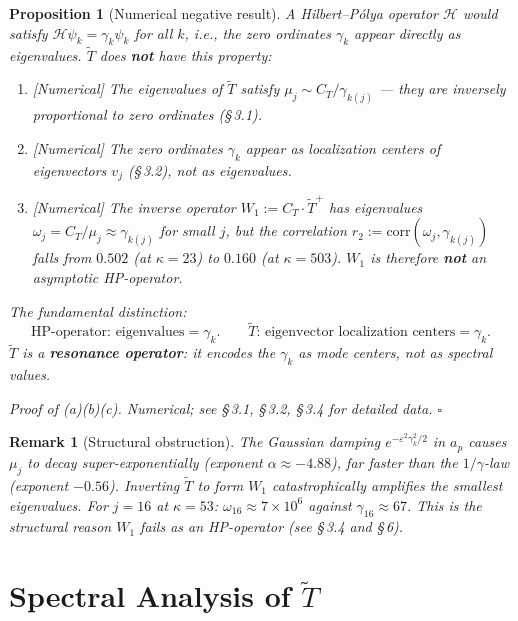 \documentclass[11pt]{article}
\newtheorem{proposition}[theorem]{Proposition}
\newtheorem*{remark}{Remark}
\newcommand{\Tt}{\widetilde{T}}
\newcommand{\CT}{C_{T}}
\newcommand{\Wone}{W_1}
\begin{document}
\begin{proposition}[Numerical negative result]\label{prop:not-HP}
A Hilbert--P\'olya operator $\mathcal{H}$ would satisfy
$\mathcal{H}\psi_k = \gamma_k\psi_k$ for all $k$,
i.e., the zero ordinates $\gamma_k$ appear directly as eigenvalues.
$\Tt$ does \textbf{not} have this property:
\begin{enumerate}[label=(\alph*)]
\item \emph{[Numerical]} The eigenvalues of $\Tt$ satisfy
  $\mu_j\sim\CT/\gamma_{k(j)}$ --- they are \emph{inversely} proportional
  to zero ordinates (\S\,3.1).
\item \emph{[Numerical]} The zero ordinates $\gamma_k$ appear as
  \emph{localization centers} of eigenvectors $v_j$ (\S\,3.2),
  not as eigenvalues.
\item \emph{[Numerical]} The inverse operator $\Wone := \CT\cdot\Tt^+$
  has eigenvalues $\omega_j = \CT/\mu_j \approx \gamma_{k(j)}$
  for small $j$, but the correlation
  $r_2 := \mathrm{corr}(\omega_j, \gamma_{k(j)})$
  falls from $0.502$ (at $\kappa=23$) to $0.160$ (at $\kappa=503$).
  $\Wone$ is therefore \textbf{not} an asymptotic HP-operator.
\end{enumerate}
\emph{The fundamental distinction:}
\[
\text{HP-operator: eigenvalues} = \gamma_k.
\qquad
\Tt\text{: eigenvector localization centers} = \gamma_k.
\]
$\Tt$ is a \textbf{resonance operator}: it encodes the $\gamma_k$
as mode centers, not as spectral values.

\emph{Proof of (a)(b)(c).}
Numerical; see \S\,3.1, \S\,3.2, \S\,3.4 for detailed data. $\square$
\end{proposition}

\begin{remark}[Structural obstruction]
The Gaussian damping $e^{-\varepsilon^2\gamma_k^2/2}$ in $a_p$ causes
$\mu_j$ to decay super-exponentially (exponent $\alpha\approx -4.88$),
far faster than the $1/\gamma$-law (exponent $-0.56$).
Inverting $\Tt$ to form $\Wone$ catastrophically amplifies the smallest
eigenvalues.
For $j=16$ at $\kappa=53$:
$\omega_{16}\approx 7\times 10^6$ against $\gamma_{16}\approx 67$.
This is the structural reason $\Wone$ fails as an HP-operator
(see \S\,3.4 and \S\,6).
\end{remark}

\section{Spectral Analysis of $\widetilde{T}$}
\end{document}

